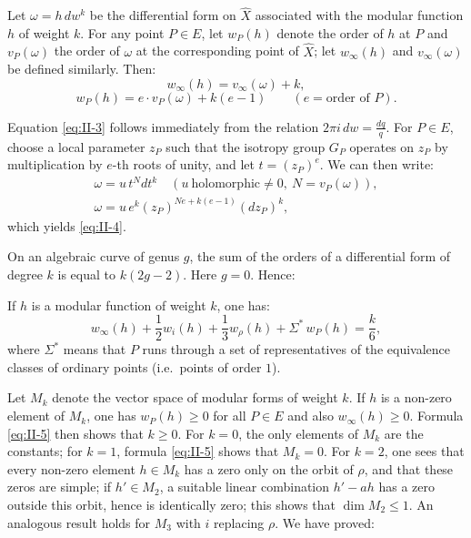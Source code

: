 \begin{proposition}\label{prop:II-7}
Let $\omega=h\,dw^{k}$ be the differential form on $\hat{X}$ associated
with the modular function $h$ of weight $k$. For any point $P\in E$, let
$w_{P}(h)$ denote the order of $h$ at $P$ and $v_{P}(\omega)$ the order of
$\omega$ at the corresponding point of $\hat{X}$; let $w_{\infty}(h)$ and
$v_{\infty}(\omega)$ be defined similarly. Then:
\[
w_{\infty}(h)=v_{\infty}(\omega)+k,
\tag{3}\label{eq:II-3}
\]
\[
w_{P}(h)=e\cdot v_{P}(\omega)+k(e-1)\qquad(e=\text{order of }P).
\tag{4}\label{eq:II-4}
\]
\end{proposition}

Equation \eqref{eq:II-3} follows immediately from the relation
$2\pi i\,dw=\frac{dq}{q}$. For $P\in E$, choose a local parameter $z_{P}$
such that the isotropy group $G_{P}$ operates on $z_{P}$ by multiplication
by $e$-th roots of unity, and let $t=(z_{P})^{e}$. We can then write:
\[
\begin{gathered}
\omega=u\,t^{N}dt^{k}\quad(u\ \text{holomorphic}\neq 0,\ N=v_{P}(\omega)),\\
\omega=u\,e^{k}(z_{P})^{Ne+k(e-1)}(dz_{P})^{k},
\end{gathered}
\]
which yields \eqref{eq:II-4}.

On an algebraic curve of genus $g$, the sum of the orders of a
differential form of degree $k$ is equal to $k(2g-2)$. Here $g=0$. Hence:

\setcounter{corollary}{0}
\xdef\theHcorollary{ch2.blockB.\arabic{corollary}}
\begin{corollary}\label{cor:II-valence}
If $h$ is a modular function of weight $k$, one has:
\[
w_{\infty}(h)+\frac{1}{2}w_{i}(h)+\frac{1}{3}w_{\rho}(h)
+\Sigma^{*}\,w_{P}(h)=\frac{k}{6},
\tag{5}\label{eq:II-5}
\]
where $\Sigma^{*}$ means that $P$ runs through a set of representatives
of the equivalence classes of ordinary points (i.e.\ points of order $1$).
\end{corollary}


Let $M_{k}$ denote the vector space of modular forms of weight $k$. If $h$
is a non-zero element of $M_{k}$, one has $w_{P}(h)\geq 0$ for all
$P\in E$ and also $w_{\infty}(h)\geq 0$. Formula \eqref{eq:II-5} then
shows that $k\geq 0$. For $k=0$, the only elements of $M_{k}$ are the
constants; for $k=1$, formula \eqref{eq:II-5} shows that $M_{k}=0$. For
$k=2$, one sees that every non-zero element $h\in M_{k}$ has a zero only
on the orbit of $\rho$, and that these zeros are simple; if $h'\in M_{2}$,
a suitable linear combination $h'-ah$ has a zero outside this orbit, hence
is identically zero; this shows that $\dim M_{2}\leq 1$. An analogous
result holds for $M_{3}$ with $i$ replacing $\rho$. We have proved:

